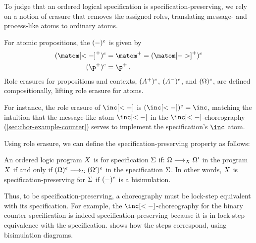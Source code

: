\documentclass[
  class=../hdeyoung-proposal,
  crop=false
]{standalone}
\begin{document}
To judge that an ordered logical specification is specification-preserving, we rely on a notion of erasure that removes the assigned roles, translating message- and process-like atoms to ordinary atoms.
\begin{definition}
  For atomic propositions, the  $(-)^{e}$ is given by
  \begin{align*}
    \erasemsg{\matom[<-]^+} &= \matom^+ = \erasemsg{\matom[->]^+} \\
    \erasemsg{\p^+} &= \p^+
    \,.
  \end{align*}
  Role erasures for propositions and contexts, $(A^+)^{e}$, $(A^-)^{e}$, and $(\Omega)^{e}$, are defined compositionally, lifting role erasure for atoms.
\end{definition}
For instance, the role erasure of $\inc[<-]$ is $\erasemsg{\inc[<-]} = \inc$, matching the intuition that the message-like atom $\inc[<-]$ in the $\inc[<-]$-choreography (\cref{sec:chor-example-counter}) serves to implement the specification's $\inc$ atom.

Using role erasure, we can define the specification-preserving property as follows:
\begin{definition}
  An ordered logic program $X$ is  for specification $\Sigma$ if:
  $\octx \trans[\chor] \octx'$ in the program $X$ if and only if $\erasemsg{\octx} \trans[\spec] \erasemsg{\octx'}$ in the specification $\Sigma$.
  In other words, $X$ is specification-preserving for $\Sigma$ if $(-)^{e}$ is a bisimulation.
\end{definition}

Thus, to be specification-preserving, a choreography must be lock-step equivalent with its specification.
For example, the $\inc[<-]$-choreography for the binary counter specification is indeed specification-preserving because it is in lock-step equivalence with the specification.
 shows how the steps correspond, using bisimulation diagrams.
\end{document}
